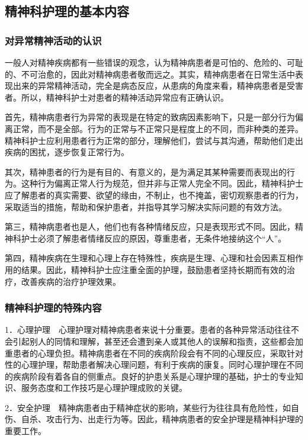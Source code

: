 \subsection{精神科护理的基本内容}

\subsubsection{对异常精神活动的认识}

一般人对精神疾病都有一些错误的观念，认为精神病患者是可怕的、危险的、可耻的、不可治愈的，因此对精神病患者敬而远之。其实，精神病患者在日常生活中表现出来的异常精神活动，完全是病态反应，从患病的角度来看，精神病患者是受害者。所以，精神科护士对患者的精神活动异常应有正确认识。

首先，精神病患者行为异常的表现是在特定的致病因素影响下，只是一部分行为偏离正常，而不是全部。行为的正常与不正常只是程度上的不同，而非种类的差异。精神科护士应利用患者行为正常的部分，理解他们，尝试与其沟通，帮助他们走出疾病的困扰，逐步恢复正常行为。

其次，精神患者的行为是有目的、有意义的，是为满足其某种需要而表现出的行为。这种行为偏离正常人行为规范，但并非与正常人完全不同。因此，精神科护士应了解患者的真实需要、欲望的缘由，不制止，也不掩盖，密切观察患者的行为，采取适当的措施，帮助和保护患者，并指导其学习解决实际问题的有效方法。

第三，精神病患者也是人，他们也有各种情绪反应，只是表现形式不同。因此，精神科护士必须了解患者情绪反应的原因，尊重患者，无条件地接纳这个“人”。

第四，精神疾病在生理和心理上存在特殊性，疾病是生理、心理和社会因素互相作用的结果。因此，精神科护士应注重全面的护理，鼓励患者坚持长期而有效的治疗，改善疾病的治疗护理效果。

\subsubsection{精神科护理的特殊内容}

1．心理护理　心理护理对精神病患者来说十分重要。患者的各种异常活动往往不会引起别人的同情和理解，甚至还会遭到亲人或其他人的误解和指责，这些都会加重患者的心理负担。精神病患者在不同的疾病阶段会有不同的心理反应，采取针对性的心理护理，帮助患者解决心理问题，有利于疾病的康复。同时心理护理在不同的疾病阶段有着各自的侧重点。良好的护患关系是心理护理的基础，护士的专业知识、服务态度和工作技巧是心理护理成败的关键。

2．安全护理　精神病患者由于精神症状的影响，某些行为往往具有危险性，如自伤、自杀、攻击行为、出走行为等。因此，精神病患者的安全护理是精神科护理的重要工作。


